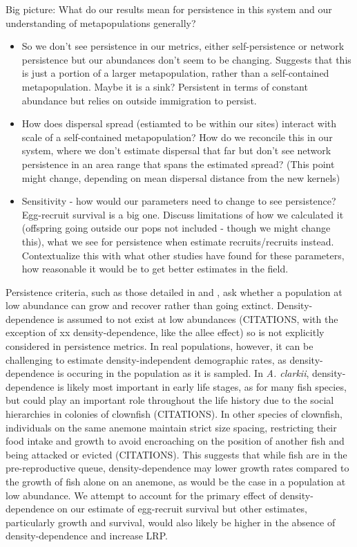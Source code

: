 \documentclass[12pt, oneside]{article}   	%
\begin{document}
Big picture: What do our results mean for persistence in this system and our understanding of metapopulations generally?
\begin{itemize}
	\item So we don't see persistence in our metrics, either self-persistence or network persistence but our abundances don't seem to be changing. Suggests that this is just a portion of a larger metapopulation, rather than a self-contained metapopulation. Maybe it is a sink? Persistent in terms of constant abundance but relies on outside immigration to persist.
	\item How does dispersal spread (estiamted to be within our sites) interact with scale of a self-contained metapopulation? How do we reconcile this in our system, where we don't estimate dispersal that far but don't see network persistence in an area range that spans the estimated spread? (This point might change, depending on mean dispersal distance from the new kernels)
	\item Sensitivity - how would our parameters need to change to see persistence? Egg-recruit survival is a big one. Discuss limitations of how we calculated it (offspring going outside our pops not included - though we might change this), what we see for persistence when estimate recruits/recruits instead. Contextualize this with what other studies have found for these parameters, how reasonable it would be to get better estimates in the field.
\end{itemize}

Persistence criteria, such as those detailed in \cite{hastings_persistence_2006} and \cite{burgess2014beyond}, ask whether a population at low abundance can grow and recover rather than going extinct. Density-dependence is assumed to not exist at low abundances (CITATIONS, with the exception of xx density-dependence, like the allee effect) so is not explicitly considered in persistence metrics. In real populations, however, it can be challenging to estimate density-independent demographic rates, as density-dependence is occuring in the population as it is sampled. In \textit{A. clarkii}, density-dependence is likely most important in early life stages, as for many fish species, but could play an important role throughout the life history due to the social hierarchies in colonies of clownfish (CITATIONS). In other species of clownfish, individuals on the same anemone maintain strict size spacing, restricting their food intake and growth to avoid encroaching on the position of another fish and being attacked or evicted (CITATIONS). This suggests that while fish are in the pre-reproductive queue, density-dependence may lower growth rates compared to the growth of fish alone on an anemone, as would be the case in a population at low abundance. We attempt to account for the primary effect of density-dependence on our estimate of egg-recruit survival but other estimates, particularly growth and survival, would also likely be higher in the absence of density-dependence and increase LRP.
\end{document}
